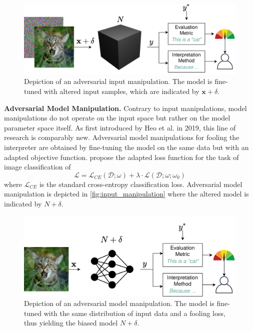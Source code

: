 \begin{figure}[ht]
    \centering
    \includegraphics[width=\linewidth]{figures/input_manipulations.png}
    \caption{Depiction of an adversarial input manipulation. The model is fine-tuned with altered input samples, which are indicated by $\mathbf{x}+\delta$.}
    \label{fig:input_manipulation}
    \vspace{-0.3cm}
\end{figure}

\par\smallskip
\noindent\textbf{Adversarial Model Manipulation.} 
Contrary to input manipulations, model manipulations do not operate on the input space but rather on the model parameter space itself. 
As first introduced by Heo et al. \cite{fooling_nn_interpreters} in 2019, this line of research is comparably new. 
Adversarial model manipulations for fooling the interpreter are obtained by fine-tuning the model on the same data but with an adapted objective function. \cite{fooling_nn_interpreters} propose the adapted loss function for the task of image classification of $$ \mathcal{L} = \mathcal{L}_{CE}(\mathcal{D};\omega) + \lambda \cdot \mathcal{L}(\mathcal{D};\omega; \omega_0) $$ where $\mathcal{L}_{CE}$ is the standard cross-entropy classification loss. 
Adversarial model manipulation is depicted in \autoref{fig:input_manipulation} where the altered model is indicated by $N+\delta$.

\begin{figure}[ht]
    \centering
    \includegraphics[width=\linewidth]{figures/model_manipulations.png}
    \caption{Depiction of an adversarial model manipulation. The model is fine-tuned with the same distribution of input data and a fooling loss, thus yielding the biased model $N+\delta$.}
    \label{fig:input_manipulation}
    \vspace{-0.3cm}
\end{figure}

